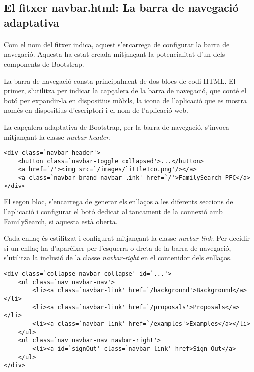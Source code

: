 \subsection{El fitxer navbar.html: La barra de navegació adaptativa}

    \paragraph{}
    Com el nom del fitxer indica, aquest s'encarrega de configurar la barra de navegació. Aquesta ha estat creada mitjançant la potencialitat d'un dels components de Bootstrap.

    La barra de navegació consta principalment de dos blocs de codi HTML. El primer, s'utilitza per indicar la capçalera de la barra de navegació, que conté el botó per expandir-la en dispositius mòbils, la icona de l'aplicació que es mostra només en dispositius d'escriptori i el nom de l'aplicació web.

    La capçalera adaptativa de Bootstrap, per la barra de navegació, s'invoca mitjançant la classe \emph{navbar-header}.

    \begin{lstlisting}[style=rawOwn,caption={Capçalera de la barra de navegació}]
<div class=`navbar-header'>
    <button class=`navbar-toggle collapsed'>...</button>
    <a href=`/'><img src=`/images/littleIco.png'/></a>
    <a class=`navbar-brand navbar-link' href=`/'>FamilySearch-PFC</a>
</div>
    \end{lstlisting}

    El segon bloc, s'encarrega de generar els enllaços a les diferents seccions de l'aplicació i configurar el botó dedicat al tancament de la connexió amb FamilySearch, si aquesta està oberta.

    Cada enllaç és estilitzat i configurat mitjançant la classe \emph{navbar-link}. Per decidir si un enllaç ha d'aparèixer per l'esquerra o dreta de la barra de navegació, s'utilitza la inclusió de la classe \emph{navbar-right} en el contenidor dels enllaços.

    \begin{lstlisting}[style=rawOwn,caption={Enllaços de la barra de navegació}]
<div class=`collapse navbar-collapse' id=`...'>
	<ul class=`nav navbar-nav'>
		<li><a class=`navbar-link' href=`/background'>Background</a></li>
		<li><a class=`navbar-link' href=`/proposals'>Proposals</a></li>
		<li><a class=`navbar-link' href=`/examples'>Examples</a></li>
	</ul>
	<ul class=`nav navbar-nav navbar-right'>
		<li><a id=`signOut' class=`navbar-link' href>Sign Out</a>
	</ul>
</div>
    \end{lstlisting}
